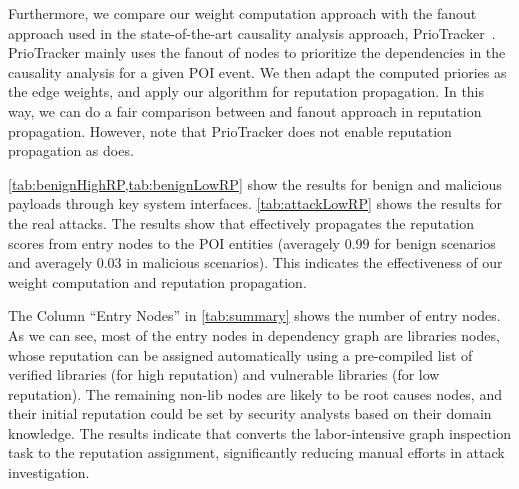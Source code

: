 Furthermore, we compare our weight computation approach with the fanout approach used in the state-of-the-art causality analysis approach, PrioTracker~\cite{liu2018priotracker}.
PrioTracker mainly uses the fanout of nodes to prioritize the dependencies in the causality analysis for a given POI event.
We then adapt the computed priories as the edge weights, and apply our algorithm for reputation propagation.
In this way, we can do a fair comparison between \tool and fanout approach in reputation propagation.
However, note that PrioTracker does not enable reputation propagation as \tool does.


% 





\cref{tab:benignHighRP,tab:benignLowRP} show the results for benign and malicious payloads through key system interfaces.
\cref{tab:attackLowRP} shows the results for the real attacks.
The results show that \tool effectively propagates the reputation scores from entry nodes to the POI entities (averagely $0.99$ for benign scenarios and averagely $0.03$ in malicious scenarios).
This indicates the effectiveness of our weight computation and reputation propagation.

The Column ``Entry Nodes'' in \cref{tab:summary} shows the number of entry nodes.
As we can see, most of the entry nodes in dependency graph are libraries nodes, whose reputation can be assigned automatically using a pre-compiled list of verified libraries (for high reputation) and vulnerable libraries (for low reputation).  
The remaining non-lib nodes are likely to be root causes nodes, and their initial reputation could be set by security analysts based on their domain knowledge.
The results indicate that \tool converts the labor-intensive graph inspection task to the reputation assignment, significantly reducing manual efforts in attack investigation.

